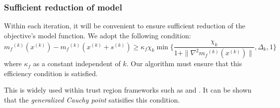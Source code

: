 \documentclass{article}
\theoremstyle{case}
\newcommand{\modelk}{{{m}_f}^{(k)}}
\newcommand{\iteratek}{{x}^{(k)}}
\newcommand{\trialk}{{s}^{(k)}}
\newcommand{\feasiblek}{{F}^{(k)}}
\begin{document}

\subsubsection{Sufficient reduction of model}

Within each iteration, it will be convenient to ensure sufficient reduction of the objective's model function.
We adopt the following condition:
\begin{equation}
\label{efficiency}
\modelk(\iteratek) - \modelk(\iteratek + \trialk) \ge \kappa_f \chi_k \min\{ \frac{\chi_k}{1+\|\nabla^2 \modelk(\iteratek)\|}, \Delta_k, 1 \}
\end{equation}
where $\kappa_f$ as a constant independent of $k$.
Our algorithm must ensure that this efficiency condition is satisfied.

This is widely used within trust region frameworks such as \cite{Conejo:2013:GCT:2620806.2621814} and \cite{Conn:2000:TM:357813}.
It can be shown that the \emph{generalized Cauchy point} satisifies this condition.


\end{document}
